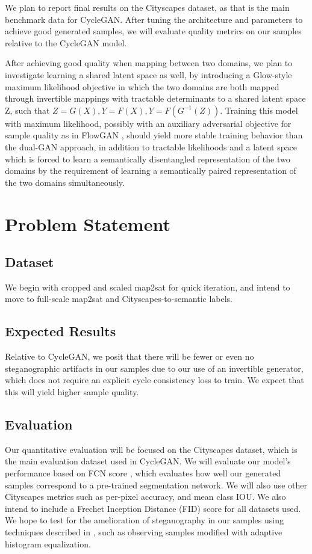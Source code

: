 \documentclass{article}
\begin{document}
We plan to report final results on the Cityscapes \citep{Cordts2016Cityscapes} dataset, as that is the main benchmark data for CycleGAN. After tuning the architecture and parameters to achieve good generated samples, we will evaluate quality metrics on our samples relative to the CycleGAN model. 

After achieving good quality when mapping between two domains, we plan to investigate learning a shared latent space as well, by introducing a Glow-style maximum likelihood objective in which the two domains are both mapped through invertible mappings with tractable determinants to a shared latent space Z, such that $Z = G(X), Y = F(X), Y = F(G^{-1}(Z))$. Training this model with maximum likelihood, possibly with an auxiliary adversarial objective for sample quality as in FlowGAN \citep{grover2017flow}, should yield more stable training behavior than the dual-GAN approach, in addition to tractable likelihoods and a latent space which is forced to learn a semantically disentangled representation of the two domains by the requirement of learning a semantically paired representation of the two domains simultaneously.

\section{Problem Statement}
\subsection{Dataset}
We begin with cropped and scaled map2sat for quick iteration, and intend to move to full-scale map2sat and Cityscapes-to-semantic labels.

\subsection{Expected Results}
Relative to CycleGAN, we posit that there will be fewer or even no steganographic artifacts in our samples due to our use of an invertible generator, which does not require an explicit cycle consistency loss to train. We expect that this will yield higher sample quality. 
\subsection{Evaluation}
Our quantitative evaluation will be focused on the Cityscapes dataset, which is the main evaluation dataset used in CycleGAN. We will evaluate our model's performance based on FCN score \citep{isola2017image}, which evaluates how well our generated samples correspond to a pre-trained segmentation network. We will also use other Cityscapes metrics such as per-pixel accuracy, and mean class IOU. We also intend to include a Frechet Inception Distance (FID) score \citep{heusel2017gans} for all datasets used. We hope to test for the amelioration of steganography in our samples using techniques described in  \citep{chu2017cyclegan}, such as observing samples modified with adaptive histogram equalization. 
\end{document}
